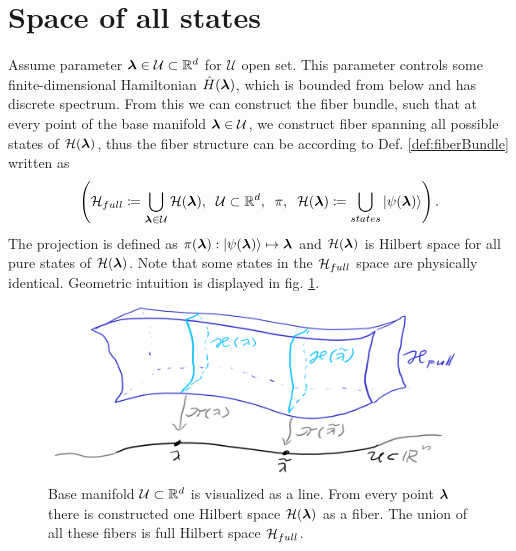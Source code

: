 \section{Space of all states}
Assume parameter ${\bm\lambda}\in\mathcal{U}\subset\mathbb{R}^d$ for $\mathcal U$ open set. This parameter controls some finite-dimensional Hamiltonian $\hat{H}({\bm\lambda})$, which is bounded from below and has discrete spectrum. From this we can construct the fiber bundle, such that at every point of the base manifold ${\bm\lambda}\in \mathcal{U}$, we construct fiber spanning all possible states of $\mathcal{H}({\bm\lambda})$, thus the fiber structure can be according to Def. \ref{def:fiberBundle} written as
$$\left(\mathcal{H}_{full}\coloneqq \bigcup_{{\bm\lambda}\in\mathcal U} \mathcal{H}({\bm\lambda}),\;\;\mathcal{U}\subset \mathbb{R}^d,\;\;\pi,\;\; \mathcal{H}({\bm\lambda}) \coloneqq \bigcup_{states}\ket{\psi({\bm\lambda})}  \right).$$
The projection is defined as $\pi({\bm\lambda}): \ket{\psi({\bm\lambda})}\mapsto {\bm\lambda}$ and $\mathcal{H}({\bm\lambda})$ is Hilbert space for all pure states of $\mathcal{H}({\bm\lambda})$. 
Note that some states in the $\mathcal{H}_{full}$ space are physically identical. Geometric intuition is displayed in fig. \ref{fig:wholeBundle}.
\begin{figure}[h]
    \centering
    \includegraphics[width=\textwidth]{../img/manifold_basic_1.png}
\caption{Base manifold $\mathcal U\subset \mathbb{R}^d$ is visualized as a line. From every point ${\bm\lambda}$ there is constructed one Hilbert space $\mathcal{H}({\bm\lambda})$ as a fiber. The union of all these fibers is full Hilbert space $\mathcal{H}_{full}$.}
    \label{fig:wholeBundle}
\end{figure}






